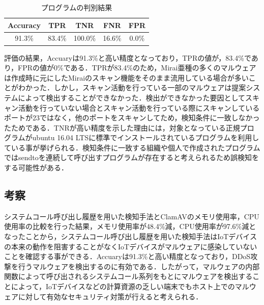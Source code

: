 \begin{table}[h]
     \caption{プログラムの判別結果} 
     \label{tab:result}
     \centering 
    \begin{tabular}{|c|c|c|c|c|} \hline 
    Accuracy & TPR    & TNR     & FNR    & FPR   \\ \hline
    91.3\%   & 83.4\% & 100.0\% & 16.6\% & 0.0\% \\ \hline
    \end{tabular}
\end{table}

評価の結果，Accuaryは91.3\%と高い精度となっており，TPRの値が，83.4\%であり，FPRの値が0\%である．TPRが83.4\%のため，Mirai亜種の多くのマルウェアは作成時に元にしたMiraiのスキャン機能をそのまま流用している場合が多いことがわかった．しかし，スキャン活動を行っている一部のマルウェアは提案システムによって検出することができなかった．検出ができなかった要因としてスキャン活動を行っていない場合とスキャン活動を行っている際にスキャンしているポートが23ではなく，他のポートをスキャンしてため，検知条件に一致しなかったためである．TNRが高い精度を示した理由には，対象となっている正規プログラムがubuntu 16.04 LTSに標準でインストールされているプログラムを利用している事が挙げられる．検知条件に一致する組織や個人で作成されたプログラムではsendtoを連続して呼び出すプログラムが存在すると考えられるため誤検知をする可能性がある．

\subsection{考察}
システムコール呼び出し履歴を用いた検知手法とClamAVのメモリ使用率，CPU使用率の比較を行った結果，メモリ使用率が48.4\%減，CPU使用率が97.6\%減となったことから，システムコール呼び出し履歴を用いた検知手法はIoTデバイスの本来の動作を阻害することがなくIoTデバイスがマルウェアに感染していないことを確認する事ができる．Accuaryは91.3\%と高い精度となっており，DDoS攻撃を行うマルウェアを検出するのに有効である．したがって，マルウェアの内部関数によって呼び出されるシステムコール系列をもとにマルウェアを検出することによって，IoTデバイスなどの計算資源の乏しい端末でもホスト上でのマルウェアに対して有効なセキュリティ対策が行えると考えられる．